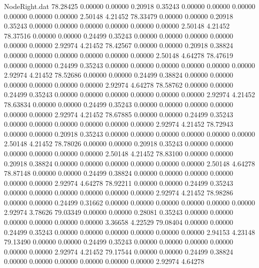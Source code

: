 \begin{filecontents}{NodeRight.dat}
  78.28425    0.00000    0.00000     0.20918    0.35243    0.00000    0.00000    0.00000    0.00000    0.00000    0.00000    2.50148    4.21452
  78.33479    0.00000    0.00000     0.20918    0.35243    0.00000    0.00000    0.00000    0.00000    0.00000    0.00000    2.50148    4.21452
  78.37516    0.00000    0.00000     0.24499    0.35243    0.00000    0.00000    0.00000    0.00000    0.00000    0.00000    2.92974    4.21452
  78.42567    0.00000    0.00000     0.20918    0.38824    0.00000    0.00000    0.00000    0.00000    0.00000    0.00000    2.50148    4.64278
  78.47619    0.00000    0.00000     0.24499    0.35243    0.00000    0.00000    0.00000    0.00000    0.00000    0.00000    2.92974    4.21452
  78.52686    0.00000    0.00000     0.24499    0.38824    0.00000    0.00000    0.00000    0.00000    0.00000    0.00000    2.92974    4.64278
  78.58762    0.00000    0.00000     0.24499    0.35243    0.00000    0.00000    0.00000    0.00000    0.00000    0.00000    2.92974    4.21452
  78.63834    0.00000    0.00000     0.24499    0.35243    0.00000    0.00000    0.00000    0.00000    0.00000    0.00000    2.92974    4.21452
  78.67885    0.00000    0.00000     0.24499    0.35243    0.00000    0.00000    0.00000    0.00000    0.00000    0.00000    2.92974    4.21452
  78.72943    0.00000    0.00000     0.20918    0.35243    0.00000    0.00000    0.00000    0.00000    0.00000    0.00000    2.50148    4.21452
  78.78026    0.00000    0.00000     0.20918    0.35243    0.00000    0.00000    0.00000    0.00000    0.00000    0.00000    2.50148    4.21452
  78.83100    0.00000    0.00000     0.20918    0.38824    0.00000    0.00000    0.00000    0.00000    0.00000    0.00000    2.50148    4.64278
  78.87148    0.00000    0.00000     0.24499    0.38824    0.00000    0.00000    0.00000    0.00000    0.00000    0.00000    2.92974    4.64278
  78.92211    0.00000    0.00000     0.24499    0.35243    0.00000    0.00000    0.00000    0.00000    0.00000    0.00000    2.92974    4.21452
  78.98286    0.00000    0.00000     0.24499    0.31662    0.00000    0.00000    0.00000    0.00000    0.00000    0.00000    2.92974    3.78626
  79.03349    0.00000    0.00000     0.28081    0.35243    0.00000    0.00000    0.00000    0.00000    0.00000    0.00000    3.36658    4.22529
  79.08404    0.00000    0.00000     0.24499    0.35243    0.00000    0.00000    0.00000    0.00000    0.00000    0.00000    2.94153    4.23148
  79.13490    0.00000    0.00000     0.24499    0.35243    0.00000    0.00000    0.00000    0.00000    0.00000    0.00000    2.92974    4.21452
  79.17544    0.00000    0.00000     0.24499    0.38824    0.00000    0.00000    0.00000    0.00000    0.00000    0.00000    2.92974    4.64278

\end{filecontents}
